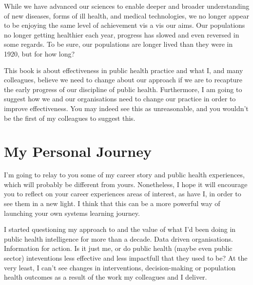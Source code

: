 While we have advanced our sciences to enable deeper and broader understanding of new diseases, forms of ill health, and medical technologies, we no longer appear to be enjoying the same level of achievement vis a vis our aims. Our populations no longer getting healthier each year, progress has slowed and even reversed in some regards. To be sure, our populations are longer lived than they were in 1920, but for how long?

This book is about effectiveness in public health practice and what I, and many colleagues, believe we need to change about our approach if we are to recapture the early progress of our discipline of public health. Furthermore, I am going to suggest how we and our organisations need to change our practice in order to improve effectiveness. You may indeed see this as unreasonable, and you wouldn't be the first of my colleagues to suggest this.

\section{My Personal Journey}
I'm going to relay to you some of my career story and public health experiences, which will probably be different from yours. Nonetheless, I hope it will encourage you to reflect on your career experiences areas of interest, as have I, in order to see them in a new light. I think that this can be a more powerful way of launching your own systems learning journey.

I started questioning my approach to and the value of what I'd been doing in public health intelligence for more than a decade. Data driven organisations. Information for action. Is it just me, or do public health (maybe even public sector) inteventions less effective and less impactfull that they used to be? At the very least, I can't see changes in interventions, decision-making or population health outcomes as a result of the work my colleagues and I deliver.

